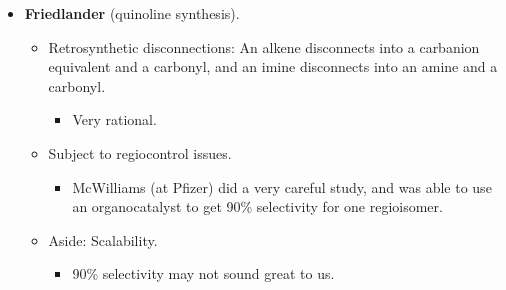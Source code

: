 \documentclass[../notes.tex]{subfiles}
\begin{document}
\begin{itemize}
\begin{itemize}
\begin{itemize}
            \item The mechanism for this is at the bottom in the box.
            \item Note that at high temperatures, Meldrum's acid is known to undergo a pericyclic decomposition to a ketene, , and acetone; evidently, only acetone gets kicked out here, not .\footnote{\href{https://en.wikipedia.org/wiki/Meldrum's_acid\#Synthesis_of_ketenes}{Wikipedia}. Note also that Meldrum's acid is so strong because the conformational restriction caused by the ring forces the $\alpha$-proton to undergo $\sigma_{\ce{CH}}\to\pi^*_{\ce{CO}}$ donation.}
            \item In fact, it appears that the whole mechanism in the box plausibly occurs via a sequence of pericyclic reactions.
        \end{itemize}
        \item Nitric acid then gives nitration.
        \item {} chlorinates the ketone and aromatizes the system.
        \item Pretty selective S\textsubscript{N}Ar occurs, even with a hindered piperazine.
        \item A note of the mechanism of action: Acrylimides (top of the finished molecule) are thought to give Michael addition with DNA.
    \end{itemize}
    \item \textbf{Friedlander} (quinoline synthesis).
    \begin{itemize}
        \item Retrosynthetic disconnections: An alkene disconnects into a carbanion equivalent and a carbonyl, and an imine disconnects into an amine and a carbonyl.
        \begin{itemize}
            \item Very rational.
        \end{itemize}
        \item Subject to regiocontrol issues.
        \begin{itemize}
            \item McWilliams (at Pfizer) did a very careful study, and was able to use an organocatalyst to get 90\% selectivity for one regioisomer.
        \end{itemize}
        \item Aside: Scalability.
        \begin{itemize}
            \item 90\% selectivity may not sound great to us.

\end{itemize}
\end{itemize}
\end{itemize}
\end{document}
